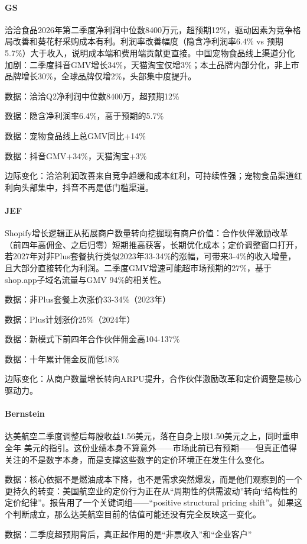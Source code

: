 \documentclass[11pt]{ctexart}
\begin{document}
\paragraph{GS} 洽洽食品2026年第二季度净利润中位数8400万元，超预期12\%，驱动因素为竞争格局改善和葵花籽采购成本有利。利润率改善幅度（隐含净利润率6.4\% vs 预期5.7\%）大于收入，说明成本端和费用端贡献更直接。中国宠物食品线上渠道分化加剧：二季度抖音GMV增长34\%，天猫淘宝仅增3\%；本土品牌内部分化，非上市品牌增长30\%，全球品牌仅增2\%，头部集中度提升。
{\small\color{refgray}数据：洽洽Q2净利润中位数8400万，超预期12\%\par}
{\small\color{refgray}数据：隐含净利润率6.4\%，高于预期的5.7\%\par}
{\small\color{refgray}数据：宠物食品线上总GMV同比+14\%\par}
{\small\color{refgray}数据：抖音GMV+34\%，天猫淘宝+3\%\par}
{\small\color{refgray}边际变化：洽洽利润改善来自竞争趋缓和成本红利，可持续性强；宠物食品渠道红利向头部集中，抖音不再是低门槛渠道。\par}
\paragraph{JEF} Shopify增长逻辑正从拓展商户数量转向挖掘现有商户价值：合作伙伴激励改革（前四年高佣金、之后归零）短期推高获客，长期优化成本；定价调整窗口打开，若2027年对非Plus套餐执行类似2023年33-34\%的涨幅，可带来3-4\%的收入增量，且大部分直接转化为利润。二季度GMV增速可能超市场预期的27\%，基于shop.app子域名流量与GMV 94\%的相关性。
{\small\color{refgray}数据：非Plus套餐上次涨价33-34\%（2023年）\par}
{\small\color{refgray}数据：Plus计划涨价25\%（2024年）\par}
{\small\color{refgray}数据：新模式下前四年合作伙伴佣金高104-137\%\par}
{\small\color{refgray}数据：十年累计佣金反而低18\%\par}
{\small\color{refgray}边际变化：从商户数量增长转向ARPU提升，合作伙伴激励改革和定价调整是核心驱动力。\par}
\paragraph{Bernstein} 达美航空二季度调整后每股收益1.56美元，落在自身上限1.50美元之上，同时重申全年 美元的指引。这份业绩本身不算意外——市场此前已有预期——但真正值得关注的不是数字本身，而是支撑这些数字的定价环境正在发生什么变化。
{\small\color{refgray}数据：核心依据不是燃油成本下降，也不是需求突然爆发，而是他们观察到的一个更持久的转变：美国航空业的定价行为正在从“周期性的供需波动”转向“结构性的定价纪律”。报告用了一个关键词组——“positive structural pricing shift”。如果这个判断成立，那么达美航空目前的估值可能还没有完全反映这一变化。\par}
{\small\color{refgray}数据：二季度超预期背后，真正起作用的是“非票收入”和“企业客户”\par}
\end{document}
